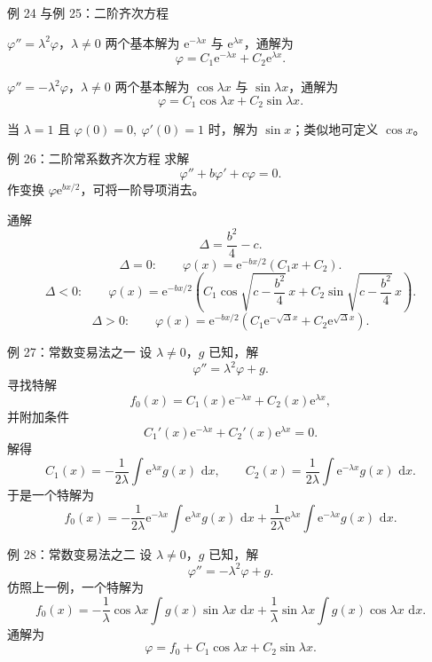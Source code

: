 \documentclass[aspectratio=169,10pt]{ctexbeamer}
\newcommand{\dd}{\,\mathrm{d}}
\newcommand{\ee}{\mathrm{e}}
\begin{document}
\begin{frame}[t]{例 24 与例 25：二阶齐次方程}
\small
\begin{block}{$\varphi''=\lambda^2\varphi$，$\lambda\ne0$}
两个基本解为 $\ee^{-\lambda x}$ 与 $\ee^{\lambda x}$，通解为
\[
  \boxed{\varphi=C_1\ee^{-\lambda x}+C_2\ee^{\lambda x}.}
\]
\end{block}

\begin{block}{$\varphi''=-\lambda^2\varphi$，$\lambda\ne0$}
两个基本解为 $\cos\lambda x$ 与 $\sin\lambda x$，通解为
\[
  \boxed{\varphi=C_1\cos\lambda x+C_2\sin\lambda x.}
\]
\end{block}

当 $\lambda=1$ 且 $\varphi(0)=0,\ \varphi'(0)=1$ 时，解为 $\sin x$；类似地可定义 $\cos x$。
\end{frame}

\begin{frame}[t]{例 26：二阶常系数齐次方程}
\small
求解
\[
  \varphi''+b\varphi'+c\varphi=0.
\]
作变换 $\varphi\ee^{bx/2}$，可将一阶导项消去。

\begin{block}{通解}
\[
\Delta=\frac{b^2}{4}-c.
\]
\[
\Delta=0:\qquad
  \varphi(x)=\ee^{-bx/2}(C_1x+C_2).
\]
\[
\Delta<0:\qquad
  \varphi(x)=\ee^{-bx/2}
  \left(C_1\cos\sqrt{c-\frac{b^2}{4}}\,x
  +C_2\sin\sqrt{c-\frac{b^2}{4}}\,x\right).
\]
\[
\Delta>0:\qquad
  \varphi(x)=\ee^{-bx/2}
  \left(C_1\ee^{-\sqrt{\Delta}x}+C_2\ee^{\sqrt{\Delta}x}\right).
\]
\end{block}
\end{frame}

\begin{frame}[t]{例 27：常数变易法之一}
\small
设 $\lambda\ne0$，$g$ 已知，解
\[
  \varphi''=\lambda^2\varphi+g.
\]
寻找特解
\[
  f_0(x)=C_1(x)\ee^{-\lambda x}+C_2(x)\ee^{\lambda x},
\]
并附加条件
\[
  C_1'(x)\ee^{-\lambda x}+C_2'(x)\ee^{\lambda x}=0.
\]
解得
\[
  C_1(x)=-\frac1{2\lambda}\int \ee^{\lambda x}g(x)\,\dd x,
\qquad
  C_2(x)=\frac1{2\lambda}\int \ee^{-\lambda x}g(x)\,\dd x.
\]
于是一个特解为
\[
\boxed{
f_0(x)=-\frac1{2\lambda}\ee^{-\lambda x}\int \ee^{\lambda x}g(x)\,\dd x
+\frac1{2\lambda}\ee^{\lambda x}\int \ee^{-\lambda x}g(x)\,\dd x.}
\]
\end{frame}

\begin{frame}[t]{例 28：常数变易法之二}
\small
设 $\lambda\ne0$，$g$ 已知，解
\[
  \varphi''=-\lambda^2\varphi+g.
\]
仿照上一例，一个特解为
\[
\boxed{
f_0(x)
=-\frac1\lambda\cos\lambda x\int g(x)\sin\lambda x\,\dd x
+\frac1\lambda\sin\lambda x\int g(x)\cos\lambda x\,\dd x.}
\]
通解为
\[
  \varphi=f_0+C_1\cos\lambda x+C_2\sin\lambda x.
\]
\end{frame}
\end{document}
